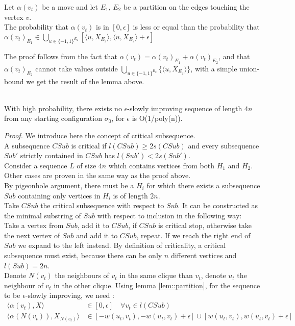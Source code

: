 \begin{lemma}
\label{lem::partition}
Let $\alpha(v_t)$ be a move and let $E_1$, $E_2$ be a partition on the edges touching the vertex $v$. \\
The probability that $\alpha(v_t)$ is in $[0, \epsilon]$ is less or equal than the probability that $\alpha(v_t)_{E_1} \in \bigcup_{u \in \{-1, 1 \}^{E_2}} [\langle u, X_{E_2}\rangle , \langle u, X_{E_2}\rangle + \epsilon]$
\end{lemma}

The proof follows from the fact that $\alpha(v_t) = \alpha(v_t)_{E_1} + \alpha(v_t)_{E_2}$, and that $\alpha(v_t)_{E_2}$ cannot take values outside $\bigcup_{u \in \{-1, 1 \}^{E_2}}\{\langle u, X_{E_2}\rangle\}$, with a simple union-bound we get the result of the lemma above.\\

\begin{proposition}
\leavevmode \\
With high probability, there exists no $\epsilon$-slowly improving sequence of length $4n$ from any starting configuration $\sigma_0$, for $\epsilon$ is O(1/poly(n)).
\end{proposition}

\textit{Proof. }
We introduce here the concept of critical subsequence. \\
A subsequence $CSub$ is critical if $l(CSub) \geq 2s(CSub)$ and every subsequence $Sub'$ strictly contained in $CSub$ has $l(Sub') < 2s(Sub')$. \\
Consider a sequence $L$ of size $4n$ which contains vertices from both $H_1$ and $H_2$. 
Other cases are proven in the same way as the proof above. \\
By pigeonhole argument, there must be a $H_i$ for which there exists a subsequence $Sub$ containing only vertices in $H_i$ is of length $2n$. \\
Take $CSub$ the critical subsequence with respect to $Sub$. It can be constructed as the minimal substring of $Sub$ with respect to inclusion in the following way:\\
Take a vertex from $Sub$, add it to $CSub$, if $CSub$ is critical stop, otherwise take the next vertex of $Sub$ and add it to $CSub$, repeat. If we reach the right end of $Sub$ we expand to the left instead. By definition of criticality, a critical subsequence must exist, because there can be only $n$ different vertices and $l(Sub) = 2n$.\\ 
Denote $N(v_t)$ the neighbours of $v_t$ in the same clique than $v_t$, denote $u_t$ the neighbour of $v_t$ in the other clique.
Using lemma \ref{lem::partition}, for the sequence to be $\epsilon$-slowly improving, we need :
\begin{equation*}
\begin{split}
\langle \alpha(v_t), X \rangle &\in [0, \epsilon] \quad \forall v_t \in l(CSub) \\
\langle \alpha(N(v_t)), X_{N(v_t)}\rangle &\in [-w(u_t,v_t), -w(u_t,v_t) + \epsilon] \cup [w(u_t,v_t), w(u_t,v_t) + \epsilon]
\end{split}
\end{equation*}

